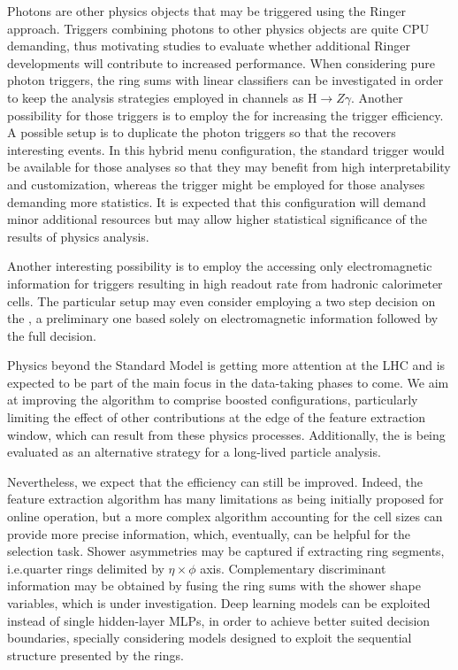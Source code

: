 Photons are other physics objects that may be triggered using the Ringer approach. Triggers combining photons to other physics objects are quite CPU demanding, thus motivating studies to evaluate whether additional Ringer developments will contribute to increased performance.
When considering pure photon triggers, the ring sums with linear classifiers can be investigated in order to keep the analysis strategies employed in channels as $\text{H}\rightarrow Z\gamma$. Another possibility for those triggers is to
employ the \rnn{} for increasing the trigger efficiency. A possible
setup is to duplicate the photon triggers so that the \rnn{} recovers
interesting events.  In this hybrid menu configuration, the standard trigger
would be available for those analyses so that they may benefit from high
interpretability and customization, whereas the \rnn{} trigger might be employed
for those analyses demanding more statistics. It is expected that this
configuration will demand minor additional resources but may allow higher
statistical significance of the results of physics analysis.


Another interesting possibility is to employ the \rnn{} accessing only
electromagnetic information for triggers resulting in high readout rate from
hadronic calorimeter cells. The particular setup may even consider employing a
two step decision on the \fastcalo{}, a preliminary one based solely on
electromagnetic information followed by the full \rnn{} decision.




Physics beyond the Standard Model is getting more attention at the LHC and is expected to be part of the main focus in the data-taking phases to
come. We aim at improving the \rnn{} algorithm to comprise boosted
configurations, particularly limiting the effect of other contributions at
the edge of the feature extraction window, which can result from these physics
processes. Additionally, the \rnn{} is being evaluated as an alternative
strategy for a long-lived particle analysis. %


Nevertheless, we expect that the \rnn{} efficiency can still be improved. Indeed, the feature extraction
algorithm has many limitations as being initially proposed for online
operation, but a more complex algorithm accounting for the cell sizes can
provide more precise information, which, eventually, can be helpful for the
selection task. Shower asymmetries may be captured if extracting ring segments,
i.e.\@ quarter rings delimited by $\eta\times\phi$ axis. Complementary
discriminant information may be obtained by fusing the ring sums with the shower shape variables,
which is under investigation. Deep learning models can be exploited instead of
single hidden-layer MLPs, in order to achieve better suited decision boundaries,
specially considering models designed to exploit the sequential structure
presented by the rings.



